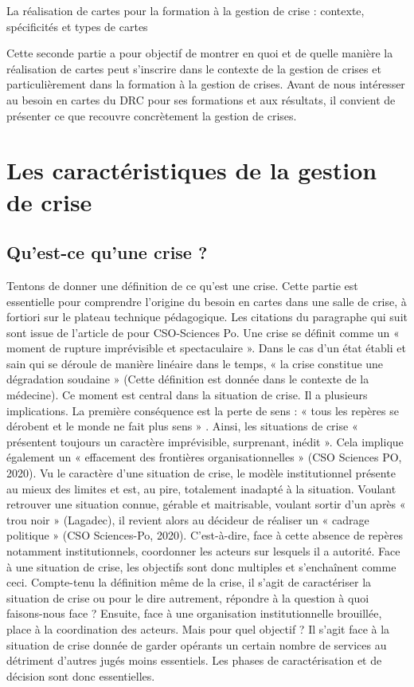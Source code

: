 \documentclass[10pt,a4paper]{report} %
\newcommand{\mychapter}[2]{ %
    \setcounter{chapter}{#1}
    \setcounter{section}{0}
    \chapter*{#2}
    \addcontentsline{toc}{chapter}{#2}
}
\begin{document}
\begin{part}{La réalisation de cartes pour la formation à la gestion de crise : contexte, spécificités et types de cartes}

Cette seconde partie a pour objectif de montrer en quoi et de quelle manière la réalisation de cartes peut s’inscrire dans le contexte de la gestion de crises et particulièrement dans la formation à la gestion de crises.  Avant de nous intéresser au besoin en cartes du DRC pour ses formations et aux résultats, il convient de présenter ce que recouvre concrètement la gestion de crises. 

\mychapter{1}{Les caractéristiques de la gestion de crise}

\section{Qu’est-ce qu’une crise ?}

Tentons de donner une définition de ce qu’est une crise. Cette partie est essentielle pour comprendre l’origine du besoin en cartes dans une salle de crise, à fortiori sur le plateau technique pédagogique.
Les citations du paragraphe qui suit sont issue de l'article de \cite{borrazolivierQuEstceQu2020} pour CSO-Sciences Po.
Une crise se définit comme un « moment de rupture imprévisible et spectaculaire ». Dans le cas d’un état établi et sain qui se déroule de manière linéaire dans le temps, « la crise constitue une dégradation soudaine » (Cette définition est donnée dans le contexte de la médecine). Ce moment est central dans la situation de crise. Il a plusieurs implications. La première conséquence est la perte de sens : « tous les repères se dérobent et le monde ne fait plus sens » \parencite{lagadecGESTIONCRISES}. Ainsi, les situations de crise « présentent toujours un caractère imprévisible, surprenant, inédit ».  Cela implique également un « effacement des frontières organisationnelles » (CSO Sciences PO, 2020). Vu le caractère d’une situation de crise, le modèle institutionnel présente au mieux des limites et est, au pire, totalement inadapté à la situation. Voulant retrouver une situation connue, gérable et maitrisable, voulant sortir d’un après « trou noir » (Lagadec), il revient alors au décideur de réaliser un « cadrage politique » (CSO Sciences-Po, 2020). C’est-à-dire, face à cette absence de repères notamment institutionnels, coordonner les acteurs sur lesquels il a autorité. Face à une situation de crise, les objectifs sont donc multiples et s’enchaînent comme ceci. Compte-tenu la définition même de la crise, il s’agit de caractériser la situation de crise ou pour le dire autrement, répondre à la question à quoi faisons-nous face ? Ensuite, face à une organisation institutionnelle brouillée, place à la coordination des acteurs. Mais pour quel objectif ? Il s’agit face à la situation de crise donnée de garder opérants un certain nombre de services au détriment d’autres jugés moins essentiels. Les phases de caractérisation et de décision sont donc essentielles. 


\end{part}
\end{document}

